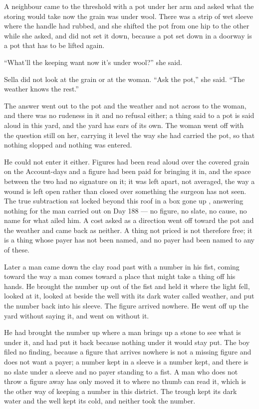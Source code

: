 \scenebreak

A neighbour came to the threshold with a pot under her arm and asked what the storing would take now the grain was under wool. There was a strip of wet sleeve where the handle had rubbed, and she shifted the pot from one hip to the other while she asked, and did not set it down, because a pot set down in a doorway is a pot that has to be lifted again.

“What’ll the keeping want now it’s under wool?” she said.

Sella did not look at the grain or at the woman. “Ask the pot,” she said. “The weather knows the rest.”

The answer went out to the pot and the weather and not across to the woman, and there was no rudeness in it and no refusal either; a thing said to a pot is said aloud in this yard, and the yard has ears of its own. The woman went off with the question still on her, carrying it level the way she had carried the pot, so that nothing slopped and nothing was entered.

He could not enter it either. Figures had been read aloud over the covered grain on the Account-days and a figure had been paid for bringing it in, and the space between the two had no signature on it; it was left apart, not averaged, the way a wound is left open rather than closed over something the surgeon has not seen. The true subtraction sat locked beyond this roof in a box gone up , answering nothing for the man carried out on Day 188 --- no figure, no slate, no cause, no name for what ailed him. A cost asked as a direction went off toward the pot and the weather and came back as neither. A thing not priced is not therefore free; it is a thing whose payer has not been named, and no payer had been named to any of these.

Later a man came down the clay road past  with a number in his fist, coming toward  the way a man comes toward a place that might take a thing off his hands. He brought the number up out of the fist and held it where the light fell, looked at it, looked at  beside the well with its dark water called weather, and put the number back into his sleeve. The figure arrived nowhere. He went off up the yard without saying it, and  went on without it.

He had brought the number up where a man brings up a stone to see what is under it, and had put it back because nothing under it would stay put. The boy filed no finding, because a figure that arrives nowhere is not a missing figure and does not want a payer; a number kept in a sleeve is a number kept, and there is no slate under a sleeve and no payer standing to a fist. A man who does not throw a figure away has only moved it to where no thumb can read it, which is the other way of keeping a number in this district. The trough kept its dark water and the well kept its cold, and neither took the number.

